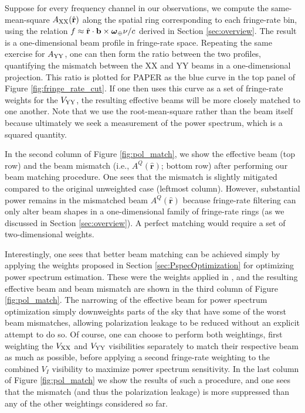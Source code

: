\documentclass[twocolumn,apj,numberedappendix]{emulateapj}
\newcommand{\rhat}{\hat{\mathbf{r}}}
\begin{document}
Suppose for every frequency channel in our observations, we compute the same-mean-square $A_{\rm XX} (\rhat)$ along
the spatial ring corresponding to each fringe-rate bin, using the relation $f \approx \rhat \cdot \mathbf{b}
\times \boldsymbol \omega_\Earth \nu / c$ derived in Section \ref{sec:overview}. The result is
a one-dimensional beam profile in fringe-rate space. Repeating the same exercise for $A_{\rm YY}$,
one can then form the ratio between the two profiles, quantifying the mismatch between the XX and YY
beams in a one-dimensional projection. This ratio is plotted for PAPER as the blue curve in the
top panel of Figure \ref{fig:fringe_rate_cut}. If one then uses this curve as a set of fringe-rate weights
for the ${V_{\rm YY}}$, the resulting effective beams will be more closely matched to one another. Note that
we use the root-mean-square rather than the beam itself because ultimately we seek a measurement
of the power spectrum, which is a squared quantity.

In the second column of Figure \ref{fig:pol_match}, we show the effective beam (top row) and the beam
mismatch (i.e., $A^Q (\rhat)$; bottom row) after performing our beam matching procedure. One sees
that the mismatch is slightly mitigated compared to the original unweighted case (leftmost column).
However, substantial power remains in the mismatched beam $A^Q (\rhat)$ because fringe-rate
filtering can only alter beam shapes in a one-dimensional family of fringe-rate rings (as we discussed in
Section \ref{sec:overview}). A perfect matching would require a set of two-dimensional weights.

Interestingly, one sees that better beam matching can be achieved simply by applying the weights
proposed in Section \ref{sec:PspecOptimization} for optimizing power spectrum estimation. These
were the weights applied in \citet{ali_et_al2015}, and the resulting effective beam and beam mismatch
are shown in the third column of Figure \ref{fig:pol_match}. The narrowing of the effective beam for
power spectrum optimization simply downweights parts of the sky that have some of the worst
beam mismatches, allowing polarization leakage to be reduced without an explicit attempt to do so.
Of course, one can choose to perform both weightings, first weighting the ${V_{\rm XX}}$ and ${V_{\rm YY}}$
visibilities separately to match their respective beam as much as possible, before applying a second fringe-rate weighting to the combined $V_I$ visibility to maximize power spectrum sensitivity.
In the last column of Figure \ref{fig:pol_match} we show the results of such a procedure, and one
sees that the mismatch (and thus the polarization leakage) is more suppressed than any
of the other weightings considered so far.
\end{document}
